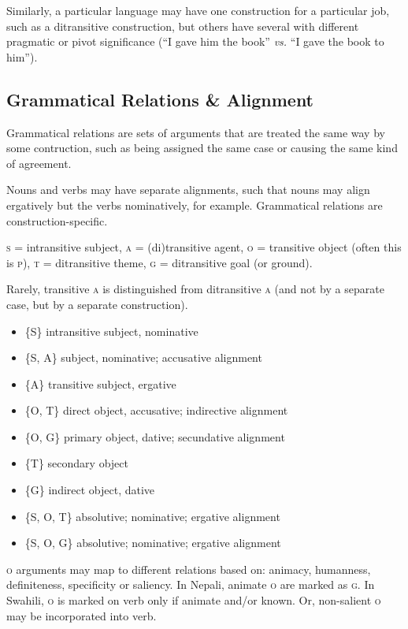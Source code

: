 \documentclass[11pt]{article}
\newcommand{\I}[1]{\textsc{#1}}   %
\newenvironment{grammarlist}%
 {\begin{itemize}\addtolength{\itemsep}{-0.5\baselineskip}\ignorespaces}%
 {\end{itemize}\ignorespacesafterend}
\begin{document}
Similarly, a particular language may have one construction for a
particular job, such as a ditransitive construction, but others have
several with different pragmatic or pivot significance (``I gave him
the book'' \textit{vs.} ``I gave the book to him'').


\subsection{Grammatical Relations \& Alignment}
Grammatical relations are sets of arguments that are treated the same
way by some contruction, such as being assigned the same case or
causing the same kind of agreement.

Nouns and verbs may have separate alignments, such that nouns may
align ergatively but the verbs nominatively, for example.  Grammatical
relations are construction-specific.

\I{s} = intransitive subject, \I{a} = (di)transitive agent, \I{o} =
transitive object (often this is \I{p}), \I{t} = ditransitive theme,
\I{g} = ditransitive goal (or ground).

Rarely, transitive \I{a} is distinguished from ditransitive \I{a} (and
not by a separate case, but by a separate construction).

\begin{grammarlist}
  \item \{\I{S}\} intransitive subject, nominative
  \item \{\I{S, A}\} subject, nominative; accusative alignment
  \item \{\I{A}\} transitive subject, ergative
  \item \{\I{O, T}\} direct object, accusative; indirective alignment
  \item \{\I{O, G}\} primary object, dative; secundative alignment
  \item \{\I{T}\} secondary object
  \item \{\I{G}\} indirect object, dative
  \item \{\I{S, O, T}\} absolutive; nominative; ergative alignment
  \item \{\I{S, O, G}\} absolutive; nominative; ergative alignment
\end{grammarlist}

\I{o} arguments may map to different relations based on: animacy,
humanness, definiteness, specificity or saliency.  In Nepali, animate
\I{o} are marked as \I{g}.  In Swahili, \I{o} is marked on verb only
if animate and/or known.  Or, non-salient \I{o} may be incorporated
into verb.
\end{document}
